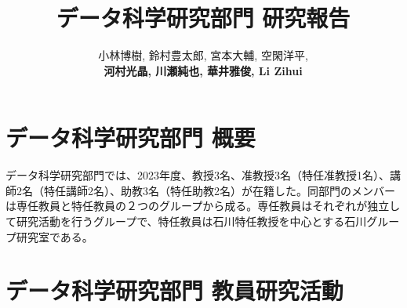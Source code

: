\documentclass[11pt]{jarticle}
\title{データ科学研究部門 研究報告}
\author{小林博樹, 鈴村豊太郎, 宮本大輔, 空閑洋平,\\
\textbf{河村光晶, 川瀬純也, 華井雅俊, Li Zihui}}
\begin{document}
\maketitle

\section{データ科学研究部門 概要}
データ科学研究部門では、2023年度、教授3名、准教授3名（特任准教授1名）、講師2名（特任講師2名）、助教3名（特任助教2名）が在籍した。同部門のメンバーは専任教員と特任教員の２つのグループから成る。専任教員はそれぞれが独立して研究活動を行うグループで、特任教員は石川特任教授を中心とする石川グループ研究室である。

%

\section{データ科学研究部門 教員研究活動}









\end{document}

